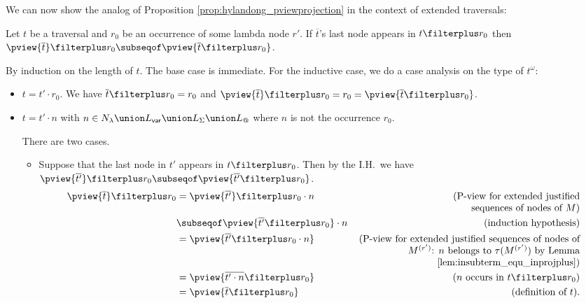 We can now show the analog of Proposition \ref{prop:hylandong_pviewprojection} in the context of extended traversals:
\begin{proposition}
\label{prop:analog_pviewprojection} Let $t$ be a traversal and $r_0$
be an occurrence of some lambda node $r'$.
If $\overline{t}$'s last node appears in $t\filterplus r_0$ then
 $\pview{ \overline{t}}  \filterplus r_0 \subseqof \pview{ \overline{t}\filterplus
 r_0}$.
\end{proposition}
\proof
By induction on the length of $t$. The base case is immediate. For the inductive case,
we do a case analysis on the type of $t^\omega$:
    \begin{itemize}
    \item $t =  t' \cdot r_0$. We have $\overline{t} \filterplus r_0 = r_0$ and
     $\pview{\overline{t}} \filterplus r_0 = r_0 = \pview{\overline{t} \filterplus r_0}$.

    \item $t = t' \cdot n$ with $n \in N_\lambda \union L_{\sf var} \union
    L_\Sigma \union L_@$ where $n$ is not the occurrence $r_0$.

    There are two cases.
    \begin{itemize}
        \item Suppose that the last node in $t'$ appears in $t\filterplus r_0$. Then
        by the I.H.\ we have $\pview{\overline{t'}} \filterplus  r_0 \subseqof \pview{\overline{t'} \filterplus  r_0}$.
            \begin{align*}
            \pview{\overline{t}} \filterplus r_0
                &=  \pview{\overline{t'}} \filterplus r_0 \cdot n  & \parbox[t]{8cm}{(\raggedleft P-view for extended justified\\sequences of nodes of $M$)} \\
                &\subseqof  \pview{\overline{t'} \filterplus  r_0} \cdot n            & (\mbox{induction hypothesis}) \\
                &=  \pview{\overline{t'} \filterplus  r_0 \cdot n} & \parbox[t]{8cm}{\raggedleft (P-view for extended justified sequences of nodes of $M^{(r')}$: $n$ belongs to $\tau(M^{(r')})$
                by Lemma \ref{lem:insubterm_equ_inprojplus})} \\
                &=  \pview{\overline{t' \cdot n} \filterplus  r_0  }   & (\mbox{$n$ occurs in $t\filterplus r_0$}) \\
                &= \pview{\overline{t} \filterplus  r_0  }     & (\mbox{definition of } t).
            \end{align*}


\end{itemize}
\end{itemize}
